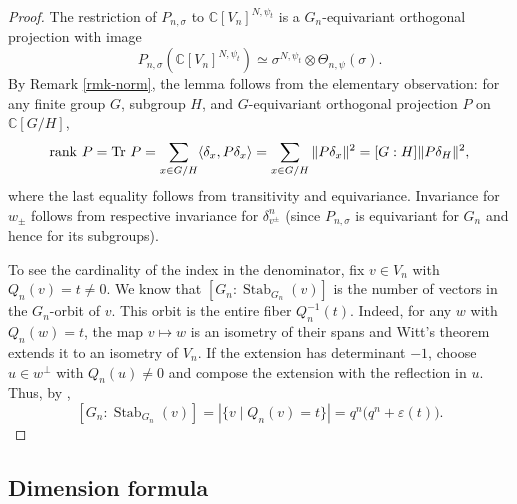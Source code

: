 \documentclass[12pt]{amsart}
\theoremstyle{definition}
\theoremstyle{remark}
\begin{document}
\begin{proof}
The restriction of $P_{n,\sigma}$ to $\mathbb C[V_n]^{N,\psi_t}$ is a $G_n$-equivariant orthogonal projection with image
\[
P_{n,\sigma} (\mathbb C[V_n]^{N,\psi_t})
\simeq
\sigma^{N,\psi_t}\otimes\Theta_{n,\psi}(\sigma).
\]
By Remark \ref{rmk-norm}, the lemma follows from the elementary observation: 
for any finite group $G$, subgroup $H$, and $G$-equivariant orthogonal projection $P$ on $\mathbb C[G/H]$,
\[
{\rm rank~} P
= {\rm Tr~} P
=\sum_{x\in G/H} \langle \delta_x,P\delta_x \rangle
=\sum_{x\in G/H}\|P\delta_x\|^2
=[G:H] \|P\delta_H\|^2,
\]
where the last equality follows from transitivity and equivariance. Invariance for $w_\pm$ follows from respective invariance for $\delta^n_{v^\pm}$ (since $P_{n,\sigma}$ is equivariant for $G_n$ and hence for its subgroups).

To see the cardinality of the index in the denominator, fix $v\in V_n$ with $Q_n(v)=t\ne0$. We know that $[G_n:\operatorname{Stab}_{G_n}(v)]$ is the number of vectors in the $G_n$-orbit of $v$. This orbit is the entire fiber $Q_n^{-1}(t)$. Indeed, for any $w$ with $Q_n(w)=t$, the map $v\mapsto w$ is an isometry of their spans and Witt’s theorem extends it to an isometry of $V_n$. 
If the extension has determinant $-1$, choose $u\in w^\perp$ with $Q_n(u)\ne0$ and compose the extension with the reflection in $u$. Thus, by \cite[Theorem 6.27]{ln97}, 
\[
[G_n:\operatorname{Stab}_{G_n}(v)]
=|\{v \mid Q_n(v)=t\}|
=q^n\bigl(q^n+\varepsilon(t)\bigr).
\] 
\end{proof}

\subsection{Dimension formula}\label{kriz1}
\end{document}
